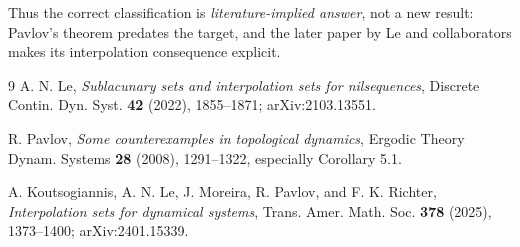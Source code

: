 \documentclass[11pt]{article}
\begin{document}
Thus the correct classification is \emph{literature-implied answer}, not a
new result: Pavlov's theorem predates the target, and the later paper by Le
and collaborators makes its interpolation consequence explicit.

\begin{thebibliography}{9}
A. N. Le,
\emph{Sublacunary sets and interpolation sets for nilsequences},
Discrete Contin. Dyn. Syst. \textbf{42} (2022), 1855--1871;
arXiv:2103.13551.

R. Pavlov,
\emph{Some counterexamples in topological dynamics},
Ergodic Theory Dynam. Systems \textbf{28} (2008), 1291--1322,
especially Corollary 5.1.

A. Koutsogiannis, A. N. Le, J. Moreira, R. Pavlov, and F. K. Richter,
\emph{Interpolation sets for dynamical systems},
Trans. Amer. Math. Soc. \textbf{378} (2025), 1373--1400;
arXiv:2401.15339.
\end{thebibliography}
\end{document}
